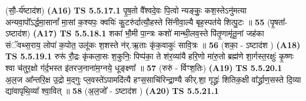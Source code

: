 \documentclass[17pt]{extarticle}
\begin{document}
                  \newline
                      (सौ॒-र्य॑ष्टाद॑श)  \textbf{(A16)} \newline \newline
                                        \textbf{ TS 5.5.17.1} \newline
                  पृ॒ष॒तो वै᳚श्वदे॒वः पि॒त्वो न्यङ्कुः॒ कश॒स्तेऽनु॑मत्या अन्यवा॒पो᳚ऽर्द्धमा॒सानां᳚ मा॒सां क॒श्यपः॒ क्वयिः॑ कु॒टरु॑र्दात्यौ॒हस्ते सि॑नीवा॒ल्यै बृह॒स्पत॑ये शित्पु॒टः ॥ \textbf{  55 } \newline
                  \newline
                      (पृ॒षता᳚- ऽष्टाद॑श)  \textbf{(A17)} \newline \newline
                                        \textbf{ TS 5.5.18.1} \newline
                  शका॑ भौ॒मी पा॒न्त्रः कशो॑ मान्थी॒लव॒स्ते पि॑तृ॒णामृ॑तू॒नां जह॑का संॅवथ्स॒राय॒ लोपा॑ क॒पोत॒ उलू॑कः श॒शस्ते न॑र्.ऋ॒ताः कृ॑क॒वाकुः॑ सावि॒त्रः ॥ \textbf{  56 } \newline
                  \newline
                      (शका॒ - ऽष्टाद॑श )  \textbf{(A18)} \newline \newline
                                        \textbf{ TS 5.5.19.1} \newline
                  रुरू॑ रौ॒द्रः कृ॑कला॒सः श॒कुनिः॒ पिप्प॑का॒ ते श॑र॒व्या॑यै हरि॒णो मा॑रु॒तो ब्रह्म॑णे शा॒र्गस्त॒रक्षुः॑ कृ॒ष्णः श्वा च॑तुर॒क्षो ग॑र्द॒भस्त इ॑तरज॒नाना॑म॒ग्नये॒ धूङ्क्ष्णा᳚ ॥ \textbf{  57 } \newline
                  \newline
                      (रुरु॑ - र्विꣳश॒तिः)  \textbf{(A19)} \newline \newline
                                        \textbf{ TS 5.5.20.1} \newline
                  अ॒ल॒ज आ᳚न्तरि॒क्ष उ॒द्रो म॒द्गुः प्ल॒वस्ते॑ऽपामदि॑त्यै हꣳस॒साचि॑रिन्द्रा॒ण्यै कीर्.शा॒ गृद्ध्रः॑ शितिक॒क्षी वा᳚र्द्ध्राण॒सस्ते दि॒व्या द्या॑वापृथि॒व्या᳚ श्वा॒वित् ॥ \textbf{  58 } \newline
                  \newline
                      (अ॒ल॒जो᳚ - ऽष्टाद॑श )  \textbf{(A20)} \newline \newline
                                        \textbf{ TS 5.5.21.1} \newline
\end{document}

